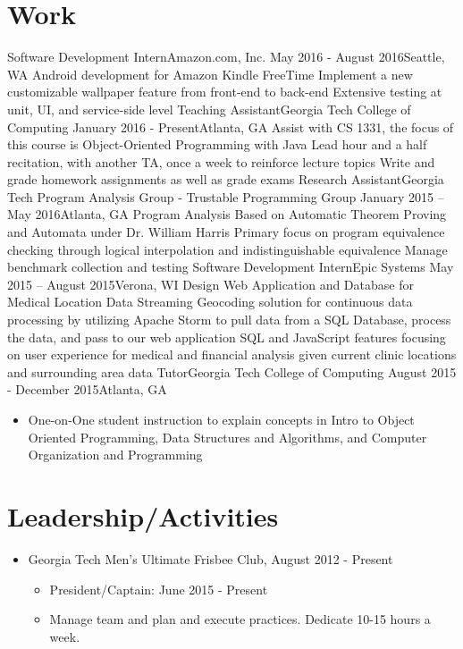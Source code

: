 \documentclass{resume_template}
\begin{document}
	\section{Work}
		\noindent\workinfo
			{Software Development Intern}{Amazon.com, Inc.}
			{May 2016 - August 2016}{Seattle, WA}
    	\workitems
		{Android development for Amazon Kindle FreeTime}
		{Implement a new customizable wallpaper feature from front-end to back-end}
		{Extensive testing at unit, UI, and service-side level}
		\workinfo
			{Teaching Assistant}{Georgia Tech College of Computing}
			{January 2016 - Present}{Atlanta, GA}
		\workitems
			{Assist with CS 1331, the focus of this course is Object-Oriented Programming with Java}
			{Lead hour and a half recitation, with another TA, once a week to reinforce lecture topics}
			{Write and grade homework assignments as well as grade exams}
		\workinfo
		{Research Assistant}{Georgia Tech Program Analysis Group - Trustable Programming Group}
		{January 2015 – May 2016}{Atlanta, GA}
		\workitems
		{Program Analysis Based on Automatic Theorem Proving and Automata under Dr. William Harris}
		{Primary focus on program equivalence checking through logical interpolation and indistinguishable equivalence}
		{Manage benchmark collection and testing}
		\workinfo
			{Software Development Intern}{Epic Systems}
			{May 2015 – August 2015}{Verona, WI}
		\workitems
			{Design Web Application and Database for Medical Location Data}
			{Streaming Geocoding solution for continuous data processing by utilizing Apache Storm to pull data from a SQL
				Database, process the data, and pass to our web application}
			{SQL and JavaScript features focusing on user experience for medical and financial analysis given current clinic
				locations and surrounding area data}
		\workinfo
			{Tutor}{Georgia Tech College of Computing}
			{August 2015 - December 2015}{Atlanta, GA}
		\begin{itemize}[leftmargin=0.4cm]
		\item One-on-One student instruction to explain concepts in Intro to Object Oriented Programming, Data Structures and
			Algorithms, and Computer Organization and Programming	
		\end{itemize}
	\section{Leadership/Activities}
		
	\begin{itemize}[nosep, leftmargin=0.4cm]
	\item Georgia Tech Men's Ultimate Frisbee Club, August 2012 - Present
		\begin{itemize}[nosep]
		\item[] President/Captain: June 2015 - Present
		\item[] Manage team and plan and execute practices. Dedicate 10-15 hours a week.
		\end{itemize}
	\end{itemize}
\end{document}

